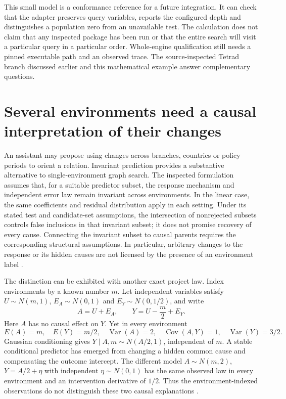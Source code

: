 This small model is a conformance reference for a future integration. It can
check that the adapter preserves query variables, reports the configured
depth and distinguishes a population zero from an unavailable test. The
calculation does not claim that any inspected package has been run or that
the entire search will visit a particular query in a particular order.
Whole-engine qualification still needs a pinned executable path and an
observed trace. The source-inspected Tetrad branch discussed earlier and this
mathematical example answer complementary questions.

\section{Several environments need a causal interpretation of their changes}
\label{exec14:l4-environments}

An assistant may propose using changes across branches, countries or policy
periods to orient a relation. Invariant prediction provides a substantive
alternative to single-environment graph search. The inspected formulation
assumes that, for a suitable predictor subset, the response mechanism and
independent error law remain invariant across environments. In the linear
case, the same coefficients and residual distribution apply in each setting.
Under its stated test and candidate-set assumptions, the intersection of
nonrejected subsets controls false inclusions in that invariant subset; it
does not promise recovery of every cause. Connecting the invariant subset to
causal parents requires the corresponding structural assumptions. In
particular, arbitrary changes to the response or its hidden causes are not
licensed by the presence of an environment label
\citep{petersicp2016}.

The distinction can be exhibited with another exact project law. Index
environments by a known number $m$. Let independent variables satisfy
$U\sim N(m,1)$, $E_A\sim N(0,1)$ and $E_Y\sim N(0,1/2)$, and write
\[
 A=U+E_A,\qquad Y=U-\frac m2+E_Y.
\]
Here $A$ has no causal effect on $Y$. Yet in every environment
\[
 E(A)=m,\quad E(Y)=m/2,\quad
 \operatorname{Var}(A)=2,\quad \operatorname{Cov}(A,Y)=1,
 \quad\operatorname{Var}(Y)=3/2.
\]
Gaussian conditioning gives $Y\mid A,m\sim N(A/2,1)$, independent of $m$.
A stable conditional predictor has emerged from changing a hidden common
cause and compensating the outcome intercept. The different model
$A\sim N(m,2)$, $Y=A/2+\eta$ with independent $\eta\sim N(0,1)$ has
the same observed law in every environment and an intervention derivative
of $1/2$. Thus the environment-indexed observations do not distinguish these
two causal explanations \citep{exec14_discovery_design_oracles}.

